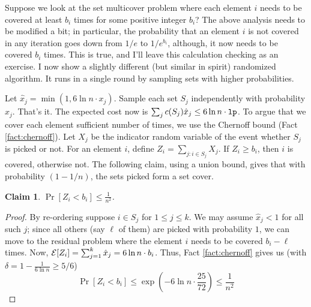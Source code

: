 \documentclass[11pt]{article}
\newtheorem{claim}{Claim}
\def\lp{{\tt lp}}
\begin{document}
\noindent
Suppose we look at the set multicover problem where each element $i$ needs to be covered at least $b_i$ times for some positive integer $b_i$? The above analysis needs to be modified a bit; in particular, the probability that an element $i$ is not covered in any iteration goes down from $1/e$ to $1/e^{b_i}$, although, it now needs to be covered $b_i$ times. This is true, and I'll leave this calculation checking as an exercise. I now show a slightly different (but similar in spirit) randomized algorithm.
It runs in a single round by sampling sets with higher probabilities.

\def\x{\hat{x}}
Let $\x_j = \min(1,6\ln n\cdot x_j)$. Sample each set $S_j$ independently with probability $\x_j$. That's it. 
The expected cost now is $\sum_j c(S_j)\x_j \le 6\ln n\cdot\lp$. To argue that we cover each element
sufficient number of times, we use the Chernoff bound (Fact \ref{fact:chernoff}). Let $X_j$ be the indicator 
random variable of the event whether $S_j$ is picked or not. For an element $i$, define $Z_i = \sum_{j:i\in S_j} X_j$.
If $Z_i \ge b_i$, then $i$ is covered, otherwise not. The following claim, using a union bound, gives that with probability 
$(1-1/n)$, the sets picked form a set cover.

\begin{claim}
$\Pr[Z_i < b_i] \le \frac{1}{n^2}$.
\end{claim}
\begin{proof}
By re-ordering suppose $i\in S_j$ for $1\le j\le k$. We may assume $\x_j < 1$ for all such $j$; since
all others (say $\ell$ of them) are picked with probability $1$,  we can move to the residual problem where the 
element $i$ needs to be covered $b_i - \ell$ times. 
Now, $\E[Z_i] = \sum_{j=1}^k\x_j = 6\ln n\cdot b_i$. Thus, Fact \ref{fact:chernoff} gives us (with $\delta = 1 - \frac{1}{6\ln n} \ge 5/6$)
$$\Pr[Z_i < b_i] \le \exp(- 6\ln n\cdot\frac{25}{72}) \le \frac{1}{n^2} $$


\end{proof}
\end{document}
